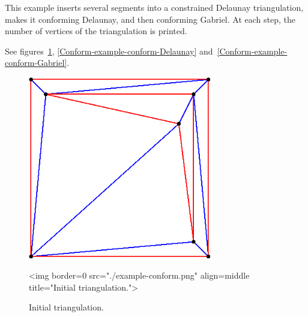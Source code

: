 This example inserts several segments into a constrained Delaunay
triangulation, makes it conforming Delaunay, and then conforming
Gabriel. At each step, the number of vertices of the triangulation is
printed.


See figures~\ref{Conform-example-conform},
\ref{Conform-example-conform-Delaunay}
and~\ref{Conform-example-conform-Gabriel}.

\begin{figure}[htbp]
\begin{center}
\begin{ccTexOnly}
\includegraphics[width=8cm]{Mesh_2/example-conform}
\end{ccTexOnly}
\begin{ccHtmlOnly}
<img border=0 src="./example-conform.png"
     align=middle title="Initial triangulation.">
\end{ccHtmlOnly}
\end{center}
\caption{Initial triangulation.}
\label{Conform-example-conform}
\end{figure}

